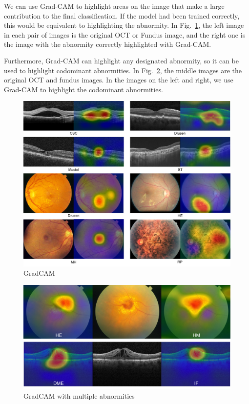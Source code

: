 \documentclass{article}
\begin{document}
	\vspace{0.3cm}
	
	We can use Grad-CAM \autocite{Selvaraju_Cogswell_Das_Vedantam_Parikh_Batra} to highlight areas on the image that make a large contribution to the final classification. If the model had been trained correctly, this would be equivalent to highlighting the abnormity. In Fig.~\ref{fig:gradCAM}, the left image in each pair of images is the original OCT or Fundus image, and the right one is the image with the abnormity correctly highlighted with Grad-CAM. 
	
	Furthermore, Grad-CAM can highlight any designated abnormity, so it can be used to highlight codominant abnormities. In Fig.~\ref{fig:gradCAM_multi_abnormity}, the middle images are the original OCT and fundus images. In the images on the left and right, we use Grad-CAM to highlight the codominant abnormities.
	
	\begin{figure}[htbp]
		\centering
		\includegraphics[width=\linewidth]{Figs/abnormity_gradCAM.pdf}
		\caption{GradCAM}
		\vspace{0.3cm}
		\label{fig:gradCAM}
	\end{figure}
	
	\begin{figure}[htbp]
		\centering
		\includegraphics[width=0.8\linewidth]{Figs/abnormity_gradCAM_multiple_abnormities.pdf}
		\caption{GradCAM with multiple abnormities}
		\vspace{0.3cm}
		\label{fig:gradCAM_multi_abnormity}
	\end{figure}
	
\end{document}
